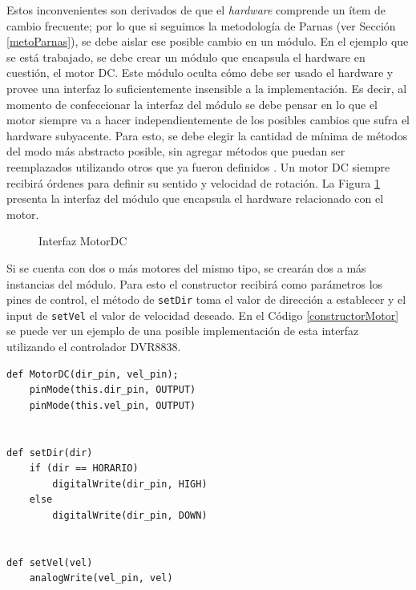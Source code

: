 Estos inconvenientes son derivados de que el \textit{hardware} comprende un ítem de cambio frecuente; por lo que si seguimos la metodología de Parnas (ver Sección \ref{metoParnas}), se debe aislar ese posible cambio en un módulo. En el ejemplo que se está trabajado, se debe crear un módulo que encapsula el hardware en cuestión, el motor \gls{DC}. Este módulo oculta cómo debe ser usado el hardware y provee una interfaz lo suficientemente insensible a la implementación. Es decir, al momento de confeccionar la interfaz del módulo se debe pensar en lo que el motor siempre va a hacer independientemente de los posibles cambios que sufra el hardware subyacente. Para esto, se debe elegir la cantidad de mínima de métodos del modo más abstracto posible, sin agregar métodos que puedan ser reemplazados utilizando otros que ya fueron definidos \cite{Parnas02, parnas1977abstract}.
Un motor \gls{DC} siempre recibirá órdenes para definir su sentido y velocidad de rotación. La Figura \ref{interfazMotor} presenta la interfaz del módulo \MotorDC que encapsula el hardware relacionado con el motor.

\begin{figure}[H]
\caption{Interfaz MotorDC}
\label{interfazMotor}
\begin{center}
\end{center}
\end{figure}

Si se cuenta con dos o más motores del mismo tipo, se crearán dos a más instancias del módulo. Para esto el constructor recibirá como parámetros los pines de control, el método de \verb|setDir| toma el valor de dirección a establecer y el input de \verb|setVel| el valor de velocidad deseado. En el Código \ref{constructorMotor} se puede ver un ejemplo de una posible implementación de esta interfaz utilizando el controlador \gls{DVR8838}.

\begin{lstlisting}[caption=Posible implementación de la interfaz del módulo MotorDC.,label={constructorMotor}]
def MotorDC(dir_pin, vel_pin);
    pinMode(this.dir_pin, OUTPUT)
    pinMode(this.vel_pin, OUTPUT)


def setDir(dir) 
    if (dir == HORARIO)
        digitalWrite(dir_pin, HIGH)
    else
        digitalWrite(dir_pin, DOWN)
        

def setVel(vel)
    analogWrite(vel_pin, vel)

\end{lstlisting}


